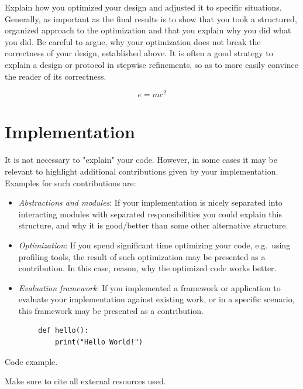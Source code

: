 Explain how you optimized your design and adjusted it to specific situations. Generally, as important as the final results is to show that you took a structured, organized approach to the optimization and that you explain why you did what you did. Be careful to argue, why your optimization does not break the correctness of your design, established above. It is often a good strategy to explain a design or protocol in stepwise refinements, so as to more easily convince the reader of its correctness.

\begin{equation}
    e = mc^2
    \label{eq:equation} 
\end{equation}

\section{Implementation} \label{sec:implementation}

It is not necessary to "explain" your code. However, in some cases it may be relevant to highlight additional contributions given by your implementation. Examples for such contributions are:

\begin{itemize}
    \item \emph{Abstractions and modules}: If your implementation is nicely separated into interacting modules with separated responsibilities you could explain this structure, and why it is good/better than some other alternative structure.

    \item \emph{Optimization}: If you spend significant time optimizing your code, e.g.~using profiling tools, the result of such optimization may be presented as a contribution. In this case, reason, why the optimized code works better.

    \item \emph{Evaluation framework}: If you implemented a framework or application to evaluate your implementation against existing work, or in a specific scenario, this framework may be presented as a contribution.
\end{itemize}

\begin{listing}[H]
    \begin{verbatim}
        def hello():
            print("Hello World!")
    \end{verbatim}
    \caption{Code example.}
    \label{lst:code}
\end{listing}

Make sure to cite all external resources used.
